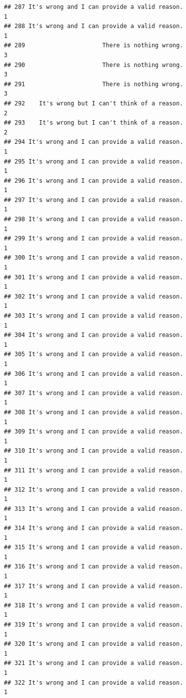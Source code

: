 \documentclass[
  american,
  man,floatsintext]{apa7}
\begin{document}
\begin{verbatim}
## 287 It's wrong and I can provide a valid reason.                    1
## 288 It's wrong and I can provide a valid reason.                    1
## 289                      There is nothing wrong.                    3
## 290                      There is nothing wrong.                    3
## 291                      There is nothing wrong.                    3
## 292    It's wrong but I can't think of a reason.                    2
## 293    It's wrong but I can't think of a reason.                    2
## 294 It's wrong and I can provide a valid reason.                    1
## 295 It's wrong and I can provide a valid reason.                    1
## 296 It's wrong and I can provide a valid reason.                    1
## 297 It's wrong and I can provide a valid reason.                    1
## 298 It's wrong and I can provide a valid reason.                    1
## 299 It's wrong and I can provide a valid reason.                    1
## 300 It's wrong and I can provide a valid reason.                    1
## 301 It's wrong and I can provide a valid reason.                    1
## 302 It's wrong and I can provide a valid reason.                    1
## 303 It's wrong and I can provide a valid reason.                    1
## 304 It's wrong and I can provide a valid reason.                    1
## 305 It's wrong and I can provide a valid reason.                    1
## 306 It's wrong and I can provide a valid reason.                    1
## 307 It's wrong and I can provide a valid reason.                    1
## 308 It's wrong and I can provide a valid reason.                    1
## 309 It's wrong and I can provide a valid reason.                    1
## 310 It's wrong and I can provide a valid reason.                    1
## 311 It's wrong and I can provide a valid reason.                    1
## 312 It's wrong and I can provide a valid reason.                    1
## 313 It's wrong and I can provide a valid reason.                    1
## 314 It's wrong and I can provide a valid reason.                    1
## 315 It's wrong and I can provide a valid reason.                    1
## 316 It's wrong and I can provide a valid reason.                    1
## 317 It's wrong and I can provide a valid reason.                    1
## 318 It's wrong and I can provide a valid reason.                    1
## 319 It's wrong and I can provide a valid reason.                    1
## 320 It's wrong and I can provide a valid reason.                    1
## 321 It's wrong and I can provide a valid reason.                    1
## 322 It's wrong and I can provide a valid reason.                    1

\end{verbatim}
\end{document}
